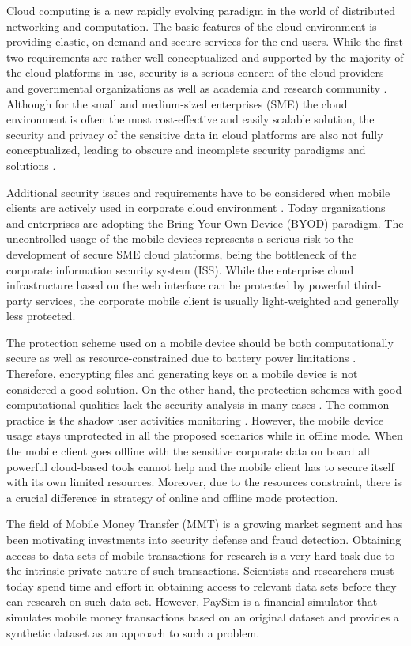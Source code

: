 Cloud computing is a new rapidly evolving paradigm in the world of distributed networking and computation. The basic features of the cloud environment is providing elastic, on-demand and secure services for the end-users. While the first two requirements are rather well conceptualized and supported by the majority of the cloud platforms in use, security is a serious concern of the cloud providers and governmental organizations as well as academia and research community \cite{csa2016,higashi2015,gartner2015}. Although for the small and medium-sized enterprises (SME) the cloud environment is often the most cost-effective and easily scalable solution, the security and privacy of the sensitive data in cloud platforms are also not fully conceptualized, leading to obscure and incomplete security paradigms and solutions \cite{galibus2017offline}.

Additional security issues and requirements have to be considered when mobile clients are actively used in corporate cloud environment \cite{yovel2014}. Today organizations and enterprises are adopting the Bring-Your-Own-Device (BYOD) paradigm. The uncontrolled usage of the mobile devices represents a serious risk to the development of secure SME cloud platforms, being the bottleneck of the corporate information security system (ISS). While the enterprise cloud infrastructure based on the web interface can be protected by powerful third-party services, the corporate mobile client is usually light-weighted and generally less protected. 

The protection scheme used on a mobile device should be both computationally secure as well as resource-constrained due to battery power limitations \cite{khan2015cloud}. Therefore, encrypting files and generating keys on a mobile device is not considered a good solution. On the other hand, the protection schemes with good computational qualities lack the security analysis in many cases \cite{khan2014bss}. The common practice is the shadow user activities monitoring \cite{yovel2014}. However, the mobile device usage stays unprotected in all the proposed scenarios while in offline mode. When the mobile client goes offline with the sensitive corporate data on board all powerful cloud-based tools cannot help and the mobile client has to secure itself with its own limited resources. Moreover, due to the resources constraint, there is a crucial difference in strategy of online and offline mode protection.

The field of Mobile Money Transfer (MMT) is a growing market segment and has been motivating investments into security defense and fraud detection. Obtaining access to data sets of mobile transactions for research is a very hard task due to the intrinsic private nature of such transactions. Scientists and researchers must today spend time and effort in obtaining access to relevant data sets before they can research on such data set. However, PaySim \cite{lopez2016paysim} is a financial simulator that simulates mobile money transactions based on an original dataset and provides a synthetic dataset as an approach to such a problem.

